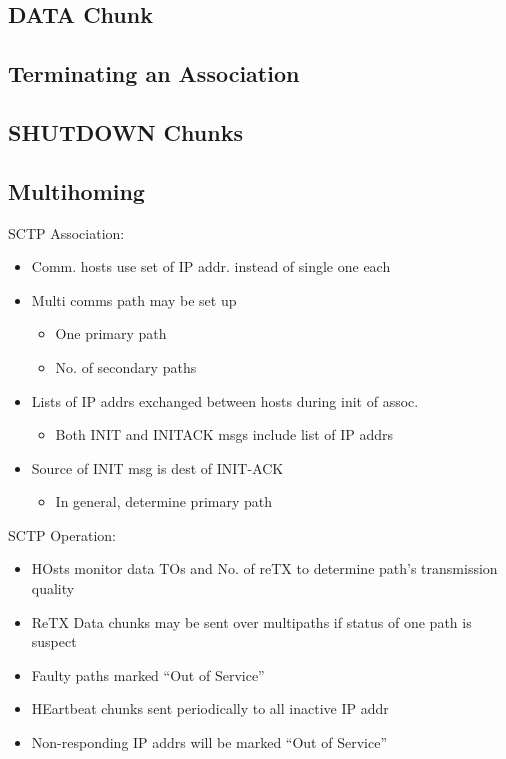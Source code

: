 \documentclass[a4paper]{article}
\begin{document}
\subsection{DATA Chunk}
\subsection{Terminating an Association}
\subsection{SHUTDOWN Chunks}
\subsection{Multihoming}
SCTP Association:
\begin{itemize}
	\item Comm. hosts use set of IP addr. instead of single one each
	\item Multi comms path may be set up
	\begin{itemize}
		\item One primary path
		\item No. of secondary paths
	\end{itemize}
	\item Lists of IP addrs exchanged between hosts during init of assoc.
	\begin{itemize}
		\item Both INIT and INITACK msgs include list of IP addrs
	\end{itemize}
	\item Source of INIT msg is dest of INIT-ACK
	\begin{itemize}
		\item In general, determine primary path
	\end{itemize}
\end{itemize}
SCTP Operation:
\begin{itemize}
	\item HOsts monitor data TOs and No. of reTX to determine path's
		transmission quality
	\item ReTX Data chunks may be sent over multipaths if status of one path
		is suspect
	\item Faulty paths marked ``Out of Service''
	\item HEartbeat chunks sent periodically to all inactive IP addr
	\item Non-responding IP addrs will be marked ``Out of Service''
\end{itemize}
\end{document}
